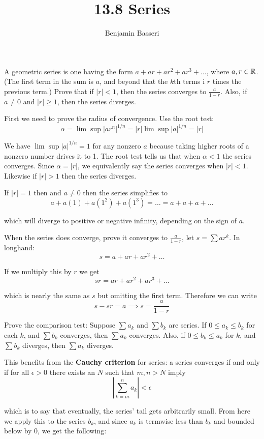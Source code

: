 \documentclass{article}
\title{13.8 Series}
\author{Benjamin Basseri}
\begin{document}
\maketitle
\begin{problem}
A geometric series is one having the form $a + ar + ar^2 + ar^3 + \ldots$, where $a, r \in \mathbb{R}$. (The first term in the sum is $a$, and beyond that the $k$th terms i $r$ times the previous term.) Prove that if $|r| < 1$, then the series converges to $\frac{a}{1 - r}$. Also, if $a \neq 0$ and $|r| \geq 1$, then the series diverges.
\end{problem}

First we need to prove the radius of convergence. Use the root test:
$$\alpha = \lim \sup |ar^n|^{1/n} = |r| \lim \sup |a|^{1/n} = |r|$$

We have $\lim \sup |a|^{1/n} = 1$ for any nonzero $a$ because taking higher roots of a nonzero number drives it to 1. The root test tells us that when $\alpha < 1$ the series converges. Since $\alpha = |r|$, we equivalently say the series converges when $|r| < 1$. Likewise if $|r| > 1$ then the series diverges.

If $|r| = 1$ then and $a \neq 0$ then the series simplifies to
$$a + a(1) + a(1^2) + a(1^3) = \ldots = a + a + a + \ldots$$

which will diverge to positive or negative infinity, depending on the sign of $a$.

When the series does converge, prove it converges to $\frac{a}{1 - r}$, let $s = \sum ar^k$. In longhand:
$$s = a + ar + ar^2 + \ldots$$

If we multiply this by $r$ we get
$$sr = ar + ar^2 + ar^3 + \ldots$$

which is nearly the same as $s$ but omitting the first term. Therefore we can write
$$s - sr = a \implies s = \frac{a}{1 - r}$$

\begin{problem}
Prove the comparison test: Suppose $\sum a_k$ and $\sum b_k$ are series. If $0 \leq a_k \leq b_k$ for each $k$, and $\sum b_k$ converges, then $\sum a_k$ converges. Also, if $0 \leq b_k \leq a_k$ for $k$, and $\sum b_k$ diverges, then $\sum a_k$ diverges.
\end{problem}

This benefits from the \textbf{Cauchy criterion} for series: a series converges if and only if for all $\epsilon > 0$ there exists an $N$ such that $m, n > N$ imply
$$\left|\sum_{k = m}^n a_k\right| < \epsilon$$

which is to say that eventually, the series' tail gets arbitrarily small. From here we apply this to the series $b_k$, and since $a_k$ is termwise less than $b_k$ and bounded below by 0, we get the following:
\end{document}
